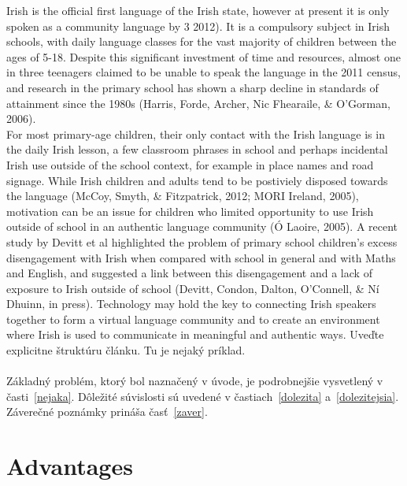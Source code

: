 \documentclass[10pt,twoside,english,a4paper]{article}
\begin{document}
Irish is the official first language of the Irish state, however at present it is only spoken as a community language by 3%
2012). It is a compulsory subject in Irish schools, with daily language classes for the vast majority of children between the ages of 5-18. Despite this significant investment
of time and resources, almost one in three teenagers claimed to be unable to speak the language in the 2011 census, and research in the primary school has shown a sharp decline in standards of attainment since the 1980s (Harris, Forde, Archer, Nic Fhearaile, \& O’Gorman, 2006). \\
For most primary-age children, their only contact with the Irish language is in the daily Irish lesson, a few classroom phrases in school and perhaps incidental Irish use outside of the school context, for example in place names and road signage. While Irish children and adults tend to be postiviely disposed towards the language (McCoy, Smyth,  \& Fitzpatrick, 2012; MORI Ireland, 2005), motivation can be an issue for children who limited opportunity to use Irish outside of school in an authentic language community (Ó Laoire, 2005). A recent study by Devitt et al highlighted the problem of primary school children’s excess disengagement with Irish when compared with school in general and with Maths and English, and suggested a link between this disengagement and a lack of exposure to Irish outside of school (Devitt, Condon, Dalton, O’Connell, \& Ní Dhuinn, in press). Technology may hold the key to connecting Irish speakers together to form a virtual language community and to create an environment where Irish is used to communicate in meaningful and authentic ways. Uveďte explicitne štruktúru článku. Tu je nejaký príklad.\\\\
Základný problém, ktorý bol naznačený v úvode, je podrobnejšie vysvetlený v časti~\ref{nejaka}.
Dôležité súvislosti sú uvedené v častiach~\ref{dolezita} a~\ref{dolezitejsia}.
Záverečné poznámky prináša časť~\ref{zaver}.



\section{Advantages} \label{Advantages}
\end{document}

